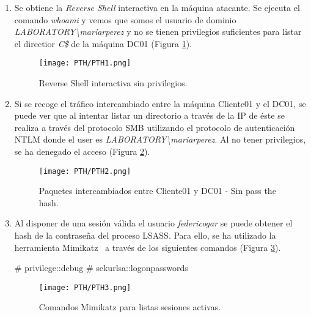 \begin{enumerate}
\item Se obtiene la {\it Reverse Shell} interactiva en la máquina atacante. Se ejecuta el comando {\it whoami} y vemos que somos el usuario de dominio {\it LABORATORY\textbackslash{}mariarperez} y no se tienen privilegios suficientes para listar el directior {\it C\$} de la máquina DC01 (Figura \ref{PTH1}).
\begin{figure}[H] %
\begin{center}
\texttt{[image: PTH/PTH1.png]}
\end{center}
\caption{Reverse Shell interactiva sin privilegios.}
\label{PTH1}
\end{figure}

\item Si se recoge el tráfico intercambiado entre la máquina Cliente01 y el DC01, se puede ver que al intentar listar un directorio a través de la IP de éste se realiza a través del protocolo SMB utilizando el protocolo de autenticación NTLM donde el user es {\it LABORATORY\textbackslash{}mariarperez}. Al no tener privilegios, se ha denegado el acceso (Figura \ref{PTH2}).
\begin{figure}[H] %
\begin{center}
\texttt{[image: PTH/PTH2.png]}
\end{center}
\caption{Paquetes intercambiados entre Cliente01 y DC01 - Sin pass the hash.}
\label{PTH2}
\end{figure}

\item  Al disponer de una sesión válida el usuario {\it federicogar} se puede  obtener el hash de la contraseña del proceso LSASS. Para ello, se ha utilizado la herramienta Mimikatz~\cite{Capitulo5:Mimikatz} a través de los siguientes comandos (Figura \ref{PTH3}).
\begin{listing}[style=consola, numbers=none]
# privilege::debug
# sekurlsa::logonpasswords
\end{listing}

\begin{figure}[H] %
\begin{center}
\texttt{[image: PTH/PTH3.png]}
\end{center}
\caption{Comandos Mimikatz para listas sesiones activas.}
\label{PTH3}
\end{figure}


\end{enumerate}
